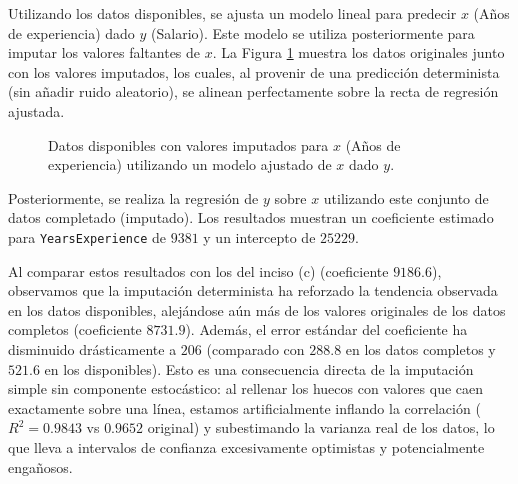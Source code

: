 \documentclass[paper=letter, fontsize=11pt, draft=false]{scrartcl}\usepackage[]{graphicx}\usepackage[]{xcolor}
\numberwithin{equation}{problemcounter} %
\numberwithin{figure}{problemcounter} %
\numberwithin{table}{problemcounter} %
\numberwithin{subsection}{problemcounter}
\begin{document}
Utilizando los datos disponibles, se ajusta un modelo lineal para predecir $x$ (Años de experiencia) dado $y$ (Salario). Este modelo se utiliza posteriormente para imputar los valores faltantes de $x$. La Figura \ref{fig:imputed_data} muestra los datos originales junto con los valores imputados, los cuales, al provenir de una predicción determinista (sin añadir ruido aleatorio), se alinean perfectamente sobre la recta de regresión ajustada.


\begin{figure}
  \centering
  \resizebox{0.5\linewidth}{!}{}
  \caption{Datos disponibles con valores imputados para $x$ (Años de experiencia) utilizando un modelo ajustado de $x$ dado $y$.}
  \label{fig:imputed_data}
\end{figure}

Posteriormente, se realiza la regresión de $y$ sobre $x$ utilizando este conjunto de datos completado (imputado). Los resultados muestran un coeficiente estimado para \texttt{YearsExperience} de $9381$ y un intercepto de $25229$.

Al comparar estos resultados con los del inciso (c) (coeficiente $9186.6$), observamos que la imputación determinista ha reforzado la tendencia observada en los datos disponibles, alejándose aún más de los valores originales de los datos completos (coeficiente $8731.9$). Además, el error estándar del coeficiente ha disminuido drásticamente a $206$ (comparado con $288.8$ en los datos completos y $521.6$ en los disponibles). Esto es una consecuencia directa de la imputación simple sin componente estocástico: al rellenar los huecos con valores que caen exactamente sobre una línea, estamos artificialmente inflando la correlación ($R^2 = 0.9843$ vs $0.9652$ original) y subestimando la varianza real de los datos, lo que lleva a intervalos de confianza excesivamente optimistas y potencialmente engañosos.



\newpage
\end{document}
